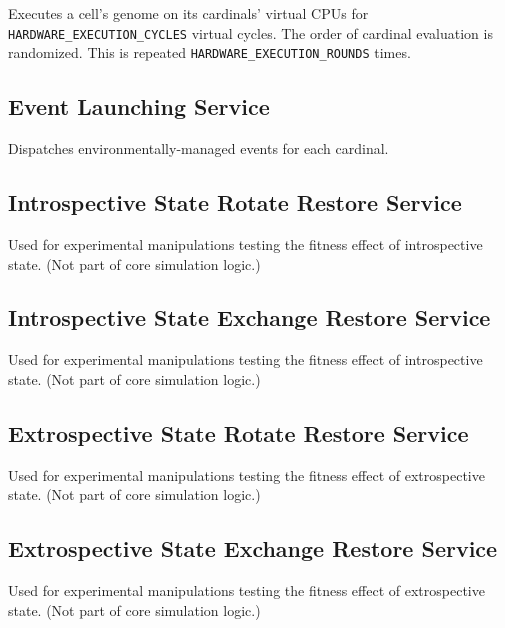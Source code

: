 Executes a cell's genome on its cardinals' virtual CPUs for \texttt{HARDWARE\_EXECUTION\_CYCLES} virtual cycles.
The order of cardinal evaluation is randomized. 
This is repeated \texttt{HARDWARE\_EXECUTION\_ROUNDS} times.

\subsection{Event Launching Service}


Dispatches environmentally-managed events for each cardinal.

\subsection{Introspective State Rotate Restore Service}


Used for experimental manipulations testing the fitness effect of introspective state.
(Not part of core simulation logic.)

\subsection{Introspective State Exchange Restore Service}


Used for experimental manipulations testing the fitness effect of introspective state.
(Not part of core simulation logic.)

\subsection{Extrospective State Rotate Restore Service}


Used for experimental manipulations testing the fitness effect of extrospective state.
(Not part of core simulation logic.)

\subsection{Extrospective State Exchange Restore Service}


Used for experimental manipulations testing the fitness effect of extrospective state.
(Not part of core simulation logic.)

